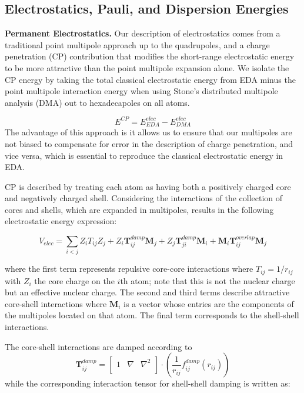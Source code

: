 \documentclass[journal=jctcce,manuscript=article]{achemso}
\begin{document}
\subsection*{Electrostatics, Pauli, and Dispersion Energies}
\textbf{Permanent Electrostatics.} Our description of electrostatics comes from a traditional point multipole approach up to the quadrupoles, and a charge penetration (CP) contribution that modifies the short-range electrostatic energy to be more attractive than the
point multipole expansion alone. We isolate the CP energy by taking the total classical electrostatic energy from EDA minus the point multipole interaction energy
when using Stone's distributed multipole analysis (DMA)\cite{stone1981distributed,stone1985distributeda}
out to hexadecapoles on all atoms.

\begin{equation}
  E^{CP}=E^{elec}_{EDA}-E^{elec}_{DMA}
  \label{eq:cp}
\end{equation}
The advantage of this approach is it allows us to ensure that our multipoles are not biased to compensate for error in the description of charge penetration, and vice versa, which is essential to reproduce the classical electrostatic energy in EDA.

CP is described by treating each atom as having both a positively charged core and negatively charged shell. Considering the interactions of the collection of cores and shells, which are expanded in multipoles,
results in the following electrostatic energy expression:

\begin{equation}
  V_{elec}=\sum_{i<j}Z_iT_{ij}Z_j+Z_i\bm{T}_{ij}^{damp}\bm{M}_j+Z_j\bm{T}_{ji}^{damp}\bm{M}_i+\bm{M}_i\bm{T}_{ij}^{overlap}\bm{M}_j
  \label{eq:elec}
\end{equation}
\noindent

where the first term represents repulsive core-core interactions where $T_{ij}=1/r_{ij}$
with $Z_i$ the core charge on the $i$th atom; note that this is not the nuclear charge but an effective
nuclear charge. The second and third terms describe attractive core-shell interactions where $\bm{M}_i$ is
a vector whose entries are the components of the multipoles located on that atom. The final term corresponds to the shell-shell interactions.

The core-shell interactions are damped according to
\begin{equation}
  \bm{T}_{ij}^{damp}=
  \begin{bmatrix}
    1 & \nabla & \nabla^2 \\
  \end{bmatrix}\cdot
  \left(\frac{1}{r_{ij}}f_{ij}^{damp}(r_{ij})\right)
  \label{eq:T_damp}
\end{equation}
\noindent
while the corresponding interaction tensor for shell-shell damping is written as:
\end{document}
